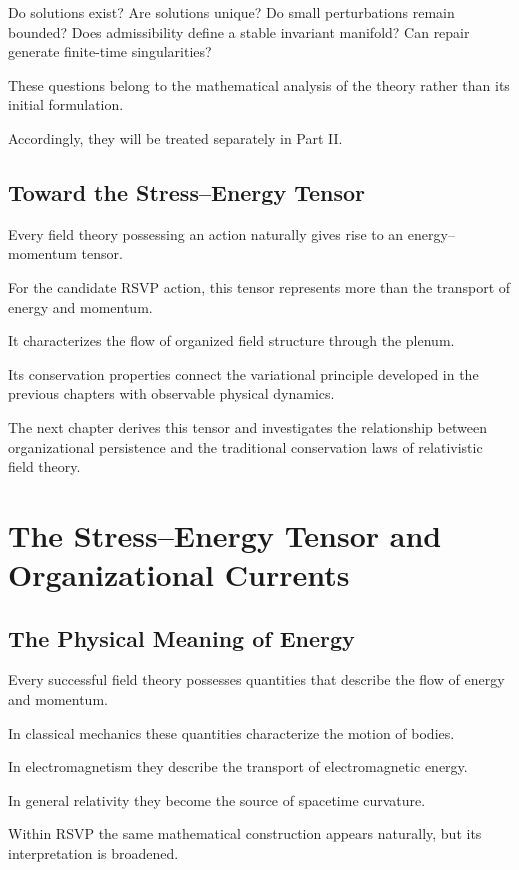 \documentclass[11pt,oneside]{book}
\numberwithin{equation}{chapter}
\theoremstyle{definition}
\theoremstyle{plain}
\begin{document}
Do solutions exist? Are solutions unique? Do small perturbations remain
bounded? Does admissibility define a stable invariant manifold? Can repair
generate finite-time singularities?

These questions belong to the mathematical analysis of the theory rather
than its initial formulation.

Accordingly, they will be treated separately in Part II.

\section{Toward the Stress--Energy Tensor}

Every field theory possessing an action naturally gives rise to an
energy--momentum tensor.

For the candidate RSVP action, this tensor represents more than the
transport of energy and momentum.

It characterizes the flow of organized field structure through the plenum.

Its conservation properties connect the variational principle developed in
the previous chapters with observable physical dynamics.

The next chapter derives this tensor and investigates the relationship
between organizational persistence and the traditional conservation laws of
relativistic field theory.

\chapter{The Stress--Energy Tensor and Organizational Currents}

\section{The Physical Meaning of Energy}

Every successful field theory possesses quantities that describe the flow of
energy and momentum.

In classical mechanics these quantities characterize the motion of bodies.

In electromagnetism they describe the transport of electromagnetic energy.

In general relativity they become the source of spacetime curvature.

Within RSVP the same mathematical construction appears naturally, but its
interpretation is broadened.
\end{document}
